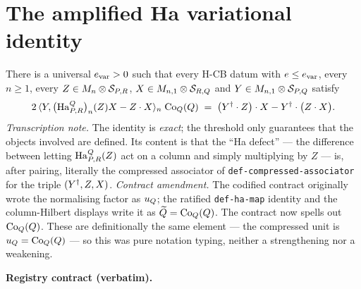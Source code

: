 \section{The amplified Ha variational identity}\label{sec:hcb1-variational-identity}

\begin{lemma}\label{lem:hcb1-variational-identity}
There is a universal $e_{\mathrm{var}}>0$ such that every H-CB datum with
$e\le e_{\mathrm{var}}$, every $n\ge1$, every $Z\in M_{n}\otimes \mathcal S_{P,R}$,
$X\in M_{n,1}\otimes\mathcal S_{R,Q}$ and $Y\in M_{n,1}\otimes\mathcal S_{P,Q}$ satisfy
\begin{equation}\label{eq:vi-main}
  2\,\langle Y,\bigl(\mathrm{Ha}^{Q}_{P,R}\bigr)_{n}(Z)X-Z\mathbin{\cdot} X\rangle_{n}\;\mathrm{Co}_{Q}(Q)
  \;=\;\bigl(Y^{\dagger}\mathbin{\cdot} Z\bigr)\mathbin{\cdot} X-Y^{\dagger}\mathbin{\cdot}\bigl(Z\mathbin{\cdot} X\bigr).
\end{equation}
\emph{Transcription note.} The identity is \emph{exact}; the threshold only guarantees
that the objects involved are defined. Its content is that the ``Ha defect'' --- the
difference between letting $\mathrm{Ha}^{Q}_{P,R}(Z)$ act on a column and simply multiplying by
$Z$ --- is, after pairing, literally the compressed associator of
\texttt{def-compressed-associator} for the triple $(Y^{\dagger},Z,X)$.
\emph{Contract amendment.} The codified contract originally wrote the normalising factor
as $u_{Q}$; the ratified \texttt{def-ha-map} identity and the column-Hilbert displays
write it as $\widetilde Q=\mathrm{Co}_{Q}(Q)$. The contract now spells out $\mathrm{Co}_{Q}(Q)$. These are
definitionally the same element --- the compressed unit is $u_{Q}=\mathrm{Co}_{Q}(Q)$ --- so
this was pure notation typing, neither a strengthening nor a weakening.
\end{lemma}

\noindent\textbf{Registry contract (verbatim).}

